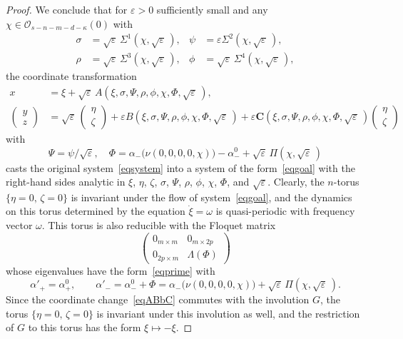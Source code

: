\documentclass[12pt,reqno]{amsart}
\theoremstyle{definition}
\begin{document}
\begin{proof}
We conclude that for ${\varepsilon}>0$ sufficiently small and any
$\chi\in{\mathcal O}_{s-n-m-d-\kappa}(0)$ with
\begin{equation}
\begin{aligned}
\sigma &= {{\sqrt{\varepsilon}}\,}\Sigma^1(\chi,{{\sqrt{\varepsilon}}\,}), & \psi &= {\varepsilon}\Sigma^2(\chi,{{\sqrt{\varepsilon}}\,}), \\
\rho &= {{\sqrt{\varepsilon}}\,}\Sigma^3(\chi,{{\sqrt{\varepsilon}}\,}), & \phi &= {{\sqrt{\varepsilon}}\,}\Sigma^4(\chi,{{\sqrt{\varepsilon}}\,}),
\end{aligned}
\label{eqsurf}
\end{equation}
the coordinate transformation
\begin{equation}
\begin{aligned}
x &= \xi+{{\sqrt{\varepsilon}}\,} A(\xi,\sigma,\Psi,\rho,\phi,\chi,\Phi,{{\sqrt{\varepsilon}}\,}), \\
\begin{pmatrix} y \\ z \end{pmatrix} &=
{{\sqrt{\varepsilon}}\,}\begin{pmatrix} \eta \\ \zeta \end{pmatrix} +
{\varepsilon} B(\xi,\sigma,\Psi,\rho,\phi,\chi,\Phi,{{\sqrt{\varepsilon}}\,}) +
{\varepsilon}{\mathbf C}(\xi,\sigma,\Psi,\rho,\phi,\chi,\Phi,{{\sqrt{\varepsilon}}\,})
\begin{pmatrix} \eta \\ \zeta \end{pmatrix}
\end{aligned}
\label{eqABbC}
\end{equation}
with
\[
\Psi=\psi/{\sqrt{\varepsilon}}, \quad
\Phi=\alpha_-\bigl(\nu(0,0,0,0,\chi)\bigr)-\alpha^0_-+{{\sqrt{\varepsilon}}\,}\Pi(\chi,{{\sqrt{\varepsilon}}\,})
\]
casts the original system~\eqref{eqsystem} into a system of the
form~\eqref{eqgoal} with the right-hand sides analytic in $\xi$, $\eta$,
$\zeta$, $\sigma$, $\Psi$, $\rho$, $\phi$, $\chi$, $\Phi$, and ${\sqrt{\varepsilon}}$.
Clearly, the $n$-torus $\{\eta=0, \, \zeta=0\}$ is invariant under the flow of
system~\eqref{eqgoal}, and the dynamics on this torus determined by the
equation $\dot{\xi}=\omega$ is quasi-periodic with frequency vector $\omega$.
This torus is also reducible with the Floquet matrix
\[
\begin{pmatrix}
0_{m\times m} & 0_{m\times 2p} \\ 0_{2p\times m} & \Lambda(\Phi)
\end{pmatrix}
\]
whose eigenvalues have the form~\eqref{eqprime} with
\[
\alpha'_+=\alpha^0_+, \qquad
\alpha'_-=\alpha^0_-+\Phi=
\alpha_-\bigl(\nu(0,0,0,0,\chi)\bigr)+{{\sqrt{\varepsilon}}\,}\Pi(\chi,{{\sqrt{\varepsilon}}\,}).
\]
Since the coordinate change~\eqref{eqABbC} commutes with the involution $G$,
the torus $\{\eta=0, \, \zeta=0\}$ is invariant under this involution as well,
and the restriction of $G$ to this torus has the form $\xi\mapsto-\xi$.


\end{proof}
\end{document}
